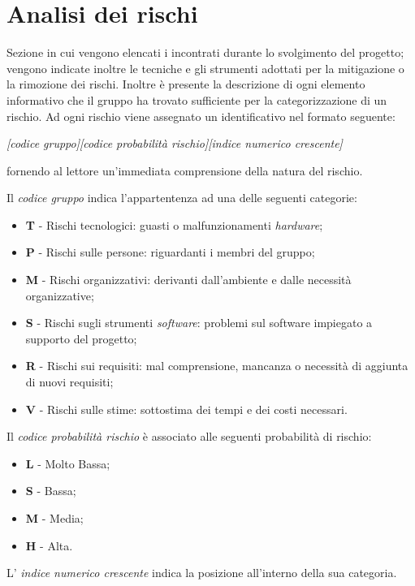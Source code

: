 \section{Analisi dei rischi} 
Sezione in cui vengono elencati i  incontrati durante lo svolgimento del progetto; vengono indicate inoltre le tecniche e gli strumenti adottati per la mitigazione o la rimozione dei rischi. Inoltre \`e presente la descrizione di ogni elemento informativo che il gruppo ha trovato sufficiente per la categorizzazione di un rischio.
Ad ogni rischio viene assegnato un identificativo nel formato seguente: 

\begin{center}
\textit{[codice gruppo][codice probabilit\`a rischio][indice numerico crescente]}  
\end{center}

fornendo al lettore un'immediata comprensione della natura del rischio.

Il \textit{codice gruppo} indica l'appartentenza ad una delle seguenti categorie:
\begin{itemize}
\item \textbf{T} - Rischi tecnologici: guasti o malfunzionamenti \textit{hardware};
\item \textbf{P} - Rischi sulle persone: riguardanti i membri del gruppo;
\item \textbf{M} - Rischi organizzativi: derivanti dall'ambiente e dalle necessit\`a organizzative;
\item \textbf{S} - Rischi sugli strumenti \textit{software}: problemi sul software impiegato a supporto del progetto;
\item \textbf{R} - Rischi sui requisiti: mal comprensione, mancanza o necessit\`a di aggiunta di nuovi requisiti;
\item \textbf{V} - Rischi sulle stime: sottostima dei tempi e dei costi necessari.
\end{itemize}

Il \textit{codice probabilit\`a rischio} \`e associato alle seguenti probabilit\`a di rischio: 
\begin{itemize}
\item \textbf{L} - Molto Bassa;
\item \textbf{S} - Bassa;
\item \textbf{M} - Media;
\item \textbf{H} - Alta.
\end{itemize}

L' \textit{indice numerico crescente} indica la posizione all'interno della sua categoria. 

